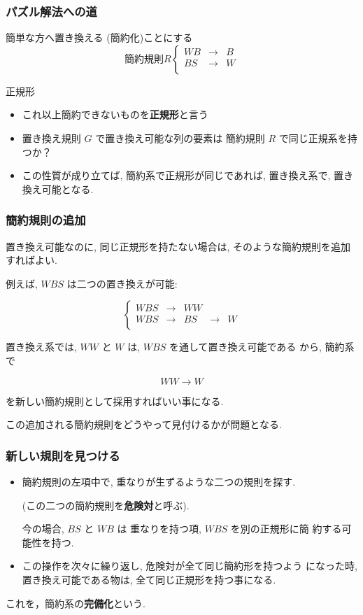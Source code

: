 \documentclass[dvipdfmx,11pt,notheorems]{beamer}
\theoremstyle{definition}
\begin{document}
\begin{frame}\frametitle{パズル解法への道}
\begin{block}{簡単な方へ置き換える (簡約化)ことにする}
\[
\mbox{簡約規則} R \left\{ \begin{array}{rll}
WB & \rightarrow  &  B\\
BS & \rightarrow   & W  \\
	  \end{array}
\right.
\]
\end{block}

\begin{block}{正規形}
\begin{itemize}
\item これ以上簡約できないものを{\bf 正規形}と言う

\item 置き換え規則 $G$ で置き換え可能な列の要素は
      簡約規則 $R$ で同じ正規系を持つか？

\item この性質が成り立てば, 簡約系で正規形が同じであれば, 
      置き換え系で, 置き換え可能となる.
\end{itemize}
\end{block}
\end{frame}

\begin{frame}\frametitle{簡約規則の追加}

置き換え可能なのに, 同じ正規形を持たない場合は,
そのような簡約規則を追加すればよい.

例えば, $WBS$ は二つの置き換えが可能:

\[
\left\{ \begin{array}{rllll}
WBS & \rightarrow  &  WW\\
WBS & \rightarrow   & BS & \rightarrow  & W\\
	  \end{array}
\right.
\]

置き換え系では, $WW$ と $W$ は, $WBS$ を通して置き換え可能である
から, 簡約系で

\[
WW  \rightarrow   W
\]

を新しい簡約規則として採用すればいい事になる.

この追加される簡約規則をどうやって見付けるかが問題となる.
\end{frame}

\begin{frame}\frametitle{新しい規則を見つける}
\begin{itemize}
\item 簡約規則の左項中で, 重なりが生ずるような二つの規則を探す.

(この二つの簡約規則を{\bf 危険対}と呼ぶ).

今の場合, $BS$ と $WB$ は 重なりを持つ項, $WBS$ を別の正規形に簡
約する可能性を持つ.

\item この操作を次々に繰り返し, 危険対が全て同じ簡約形を持つよう
になった時, 置き換え可能である物は, 全て同じ正規形を持つ事になる.
\end{itemize}

これを，簡約系の{\bf 完備化}という.
\end{frame}
\end{document}

